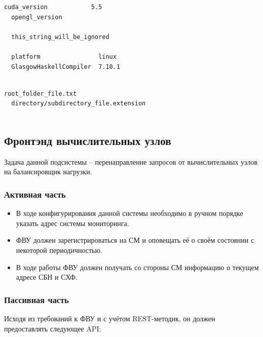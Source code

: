 \documentclass[a4paper,12pt]{report}
\numberwithin{equation}{section}
\begin{document}
  \begin{lstlisting}[float={},language={},caption={Пример корректного файла со списком черт задачи},label=lst:task-traits]
  cuda_version            5.5
  opengl_version             
       
  this_string_will_be_ignored
  
  platform                linux
  GlasgowHaskellCompiler  7.10.1
  
  \end{lstlisting}
  
  \begin{lstlisting}[float={},language={},caption={Пример корректного файла со списком выходных файлов},label=lst:task-output]
  root_folder_file.txt
  directory/subdirectory_file.extension
  
  \end{lstlisting}
  
  \subsection{Фронтэнд вычислительных узлов}
  Задача данной подсистемы -- перенаправление запросов от вычислительных узлов на балансировщик нагрузки.
  
  \subsubsection{Активная часть}
  \begin{itemize}
    \item В ходе конфигурирования данной системы необходимо в ручном порядке указать адрес системы мониторинга.
    \item ФВУ должен зарегистрироваться на СМ и оповещать её о своём состоянии с некоторой периодичностью.
    \item В ходе работы ФВУ должен получать со стороны СМ информацию о текущем адресе СБН и СХФ.
  \end{itemize}
  
  \subsubsection{Пассивная часть}
  Исходя из требований к ФВУ и с учётом REST-методик, он должен предоставлять следующее API:
  
\end{document}
